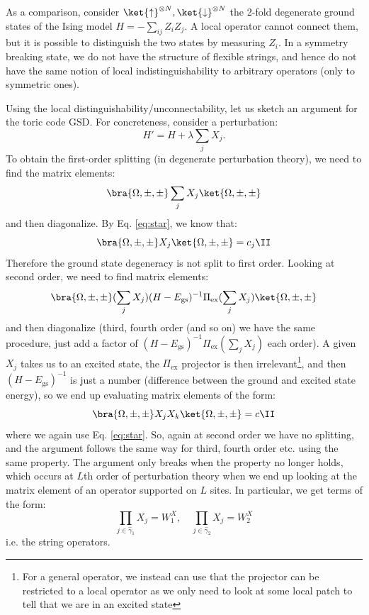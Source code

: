 As a comparison, consider $\ket{\uparrow}^{\otimes N}, \ket{\downarrow}^{\otimes N}$ the 2-fold degenerate ground states of the Ising model $H = -\sum_{ij}Z_iZ_j$. A local operator cannot connect them, but it is possible to distinguish the two states by measuring $Z_i$. In a symmetry breaking state, we do not have the structure of flexible strings, and hence do not have the same notion of local indistinguishability to arbitrary operators (only to symmetric ones).

Using the local distinguishability/unconnectability, let us sketch an argument for the toric code GSD. For concreteness, consider a perturbation:
\begin{equation}
    H' = H + \lambda \sum_j X_j.
\end{equation}
To obtain the first-order splitting (in degenerate perturbation theory), we need to find the matrix elements:
\begin{equation}
    \bra{\Omega, \pm, \pm}\sum_j X_j\ket{\Omega, \pm, \pm}
\end{equation}
and then diagonalize. By Eq. \eqref{eq:star}, we know that:
\begin{equation}
    \bra{\Omega, \pm, \pm}X_j\ket{\Omega, \pm, \pm} = c_j\II
\end{equation}
Therefore the ground state degeneracy is not split to first order. Looking at second order, we need to find matrix elements:
\begin{equation}
    \bra{\Omega, \pm, \pm}(\sum_j X_j)(H-E_{\text{gs}})^{-1}\Pi_{\text{ex}}(\sum_j X_j)\ket{\Omega, \pm, \pm}
\end{equation}
and then diagonalize (third, fourth order (and so on) we have the same procedure, just add a factor of $(H-E_{\text{gs}})^{-1}\Pi_{\text{ex}}(\sum_j X_j)$ each order). A given $X_j$ takes us to an excited state, the $\Pi_{\text{ex}}$ projector is then irrelevant\footnote{For a general operator, we instead can use that the projector can be restricted to a local operator as we only need to look at some local patch to tell that we are in an excited state}, and then $(H-E_{\text{gs}})^{-1}$ is just a number (difference between the ground and excited state energy), so we end up evaluating matrix elements of the form:
\begin{equation}
    \bra{\Omega, \pm, \pm}X_j X_k\ket{\Omega, \pm, \pm} = c\II
\end{equation}
where we again use Eq. \eqref{eq:star}. So, again at second order we have no splitting, and the argument follows the same way for third, fourth order etc. using the same property. The argument only breaks when the property no longer holds, which occurs at $L$th order of perturbation theory when we end up looking at the matrix element of an operator supported on $L$ sites. In particular, we get terms of the form:
\begin{equation}
    \prod_{j\in\hat{\gamma}_1}X_j = W_1^X, \quad \prod_{j\in\hat{\gamma}_2}X_j = W_2^X
\end{equation}
i.e. the string operators.


